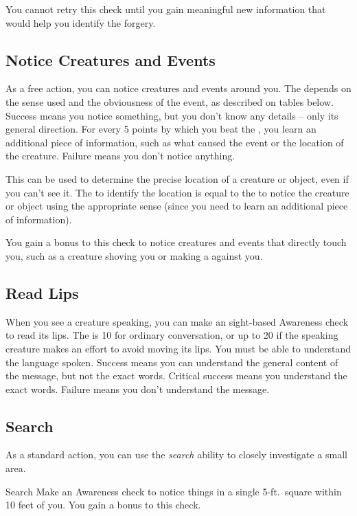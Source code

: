         You cannot retry this check until you gain meaningful new information that would help you identify the forgery.

    \subsection{Notice Creatures and Events}\label{Notice Creatures and Events}
        As a free action, you can notice creatures and events around you.
        The  depends on the sense used and the obviousness of the event, as described on tables below.
        Success means you notice something, but you don't know any details -- only its general direction.
        For every 5 points by which you beat the , you learn an additional piece of information, such as what caused the event or the location of the creature.
        Failure means you don't notice anything.

        This can be used to determine the precise location of a creature or object, even if you can't see it. The  to identify the location is equal to the  to notice the creature or object using the appropriate sense  (since you need to learn an additional piece of information).

        You gain a  bonus to this check to notice creatures and events that directly touch you, such as a creature shoving you or making a  against you.

    \subsection{Read Lips}
        When you see a creature speaking, you can make an sight-based Awareness check to read its lips.
        The  is 10 for ordinary conversation, or up to 20 if the speaking creature makes an effort to avoid moving its lips.
        You must be able to understand the language spoken.
        Success means you can understand the general content of the message, but not the exact words.
        Critical success means you understand the exact words.
        Failure means you don't understand the message.

    \subsection{Search}\label{Search}
        As a standard action, you can use the \textit{search} ability to closely investigate a small area.
        \begin{freeability}{Search}
            Make an Awareness check to notice things in a single 5-ft.\ square within 10 feet of you.
            You gain a  bonus to this check.
        \end{freeability}

